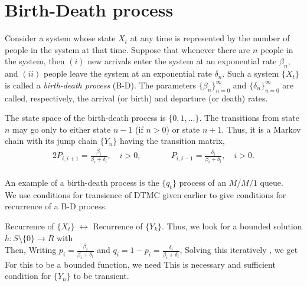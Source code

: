 \documentclass[all-lectures.tex]{subfiles}
\begin{document}

\setcounter{section}{5}
\setcounter{subsection}{0}

\section*{}

\section{Birth-Death process}
Consider a system whose state $X_t$ at any time is represented by the number of people
in the system at that time. 
Suppose that whenever there are $n$ people in the system,
then $(i)$ new arrivals enter the system at an exponential rate $\beta_n$, and $(ii)$ people
leave the system at an exponential rate $\delta_n$. 
Such a system $\{X_t\}$ is called a \textit{birth-death process} (B-D). The parameters $\{\beta_n\}^{\infty}_{n=0}$ and $\{\delta_n\}^{\infty}_{n=0}$ are called, respectively, the
arrival (or birth) and departure (or death) rates.

The state space of the birth-death process is $\{0,1, \dots\}$.
The transitions from state $n$ may go only to either state $n-1$ (if $n>0$) or
state $n + 1$. 
Thus, it is a Markov chain with its jump chain $\{Y_n\}$ having the transition matrix,
\begin{alignat*}{2}
P_{i,i+1} = \frac{\beta_i}{\beta_i+\delta_i}, \quad i>0, && \quad  \quad  P_{i,i-1} = \frac{\delta_i}{\beta_i+\delta_i},  \quad i>0.
\end{alignat*}
\\

An example of a birth-death process is the $\{q_t\}$ process of an $M/M/1$ queue. \\
We use conditions for transience of DTMC given earlier to give conditions for recurrence of a B-D process.

Recurrence of $\{X_t\}$ $\leftrightarrow $ Recurrence of $\{Y_k\}$.
Thus, we look for a bounded solution $h:S\setminus\{0\} \to R$ with
\\
Then,
Writing $p_i = \frac{\beta_i}{\beta_i + \delta_i}$ and $q_i=1-p_i = \frac{\delta_i}{\beta_i + \delta_i}$,
Solving this iteratively , we get
For this to be a bounded function, we need
This is necessary and sufficient condition for $\{Y_n\}$ to be transient.
\end{document}
